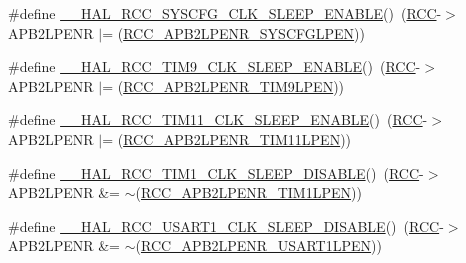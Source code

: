 \begin{DoxyCompactItemize}
\item 
\#define \hyperlink{group___r_c_c___a_p_b2___low_power___enable___disable_ga6e3a8ca9e554e3aa7aba57d034725655}{\+\_\+\+\_\+\+H\+A\+L\+\_\+\+R\+C\+C\+\_\+\+S\+Y\+S\+C\+F\+G\+\_\+\+C\+L\+K\+\_\+\+S\+L\+E\+E\+P\+\_\+\+E\+N\+A\+B\+LE}()~(\hyperlink{group___peripheral__declaration_ga74944438a086975793d26ae48d5882d4}{R\+CC}-\/$>$A\+P\+B2\+L\+P\+E\+NR $\vert$= (\hyperlink{group___peripheral___registers___bits___definition_gaaa82cfc33f0cf71220398bbe1c4b412e}{R\+C\+C\+\_\+\+A\+P\+B2\+L\+P\+E\+N\+R\+\_\+\+S\+Y\+S\+C\+F\+G\+L\+P\+EN}))
\item 
\#define \hyperlink{group___r_c_c___a_p_b2___low_power___enable___disable_ga8fb59f888889fc998d1f7e64e370c9d1}{\+\_\+\+\_\+\+H\+A\+L\+\_\+\+R\+C\+C\+\_\+\+T\+I\+M9\+\_\+\+C\+L\+K\+\_\+\+S\+L\+E\+E\+P\+\_\+\+E\+N\+A\+B\+LE}()~(\hyperlink{group___peripheral__declaration_ga74944438a086975793d26ae48d5882d4}{R\+CC}-\/$>$A\+P\+B2\+L\+P\+E\+NR $\vert$= (\hyperlink{group___peripheral___registers___bits___definition_ga91b882f3dc2b939a53ed3f4caa537de1}{R\+C\+C\+\_\+\+A\+P\+B2\+L\+P\+E\+N\+R\+\_\+\+T\+I\+M9\+L\+P\+EN}))
\item 
\#define \hyperlink{group___r_c_c___a_p_b2___low_power___enable___disable_ga2d808a429ceb72c79908770e79ff3cfa}{\+\_\+\+\_\+\+H\+A\+L\+\_\+\+R\+C\+C\+\_\+\+T\+I\+M11\+\_\+\+C\+L\+K\+\_\+\+S\+L\+E\+E\+P\+\_\+\+E\+N\+A\+B\+LE}()~(\hyperlink{group___peripheral__declaration_ga74944438a086975793d26ae48d5882d4}{R\+CC}-\/$>$A\+P\+B2\+L\+P\+E\+NR $\vert$= (\hyperlink{group___peripheral___registers___bits___definition_gad43fcaa4f4d6fb2b590a6ffee31f8c94}{R\+C\+C\+\_\+\+A\+P\+B2\+L\+P\+E\+N\+R\+\_\+\+T\+I\+M11\+L\+P\+EN}))
\item 
\#define \hyperlink{group___r_c_c___a_p_b2___low_power___enable___disable_ga990bf7664ac6c430c239eab292ec7ed5}{\+\_\+\+\_\+\+H\+A\+L\+\_\+\+R\+C\+C\+\_\+\+T\+I\+M1\+\_\+\+C\+L\+K\+\_\+\+S\+L\+E\+E\+P\+\_\+\+D\+I\+S\+A\+B\+LE}()~(\hyperlink{group___peripheral__declaration_ga74944438a086975793d26ae48d5882d4}{R\+CC}-\/$>$A\+P\+B2\+L\+P\+E\+NR \&= $\sim$(\hyperlink{group___peripheral___registers___bits___definition_ga82580245686c32761e8354fb174ba5dd}{R\+C\+C\+\_\+\+A\+P\+B2\+L\+P\+E\+N\+R\+\_\+\+T\+I\+M1\+L\+P\+EN}))
\item 
\#define \hyperlink{group___r_c_c___a_p_b2___low_power___enable___disable_ga75ec6abe2e15eaa24893a8cc83f4cb50}{\+\_\+\+\_\+\+H\+A\+L\+\_\+\+R\+C\+C\+\_\+\+U\+S\+A\+R\+T1\+\_\+\+C\+L\+K\+\_\+\+S\+L\+E\+E\+P\+\_\+\+D\+I\+S\+A\+B\+LE}()~(\hyperlink{group___peripheral__declaration_ga74944438a086975793d26ae48d5882d4}{R\+CC}-\/$>$A\+P\+B2\+L\+P\+E\+NR \&= $\sim$(\hyperlink{group___peripheral___registers___bits___definition_gab8b429bc8d52abd1ba3818a82542bb98}{R\+C\+C\+\_\+\+A\+P\+B2\+L\+P\+E\+N\+R\+\_\+\+U\+S\+A\+R\+T1\+L\+P\+EN}))

\end{DoxyCompactItemize}
